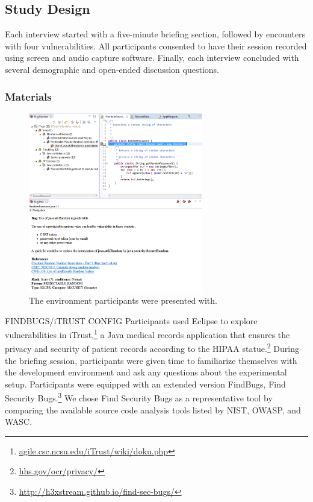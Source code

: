 \documentclass[conference]{IEEEtran}
\begin{document}
\subsection{Study Design}
\label{studyDesign}
Each interview started with a five-minute briefing section, followed by encounters with four vulnerabilities.
All participants consented to have their session recorded using screen and audio capture software.
Finally, each interview concluded with several demographic and open-ended discussion questions.


\subsubsection{Materials}

\begin{figure}
\centering
\includegraphics[width=3in]{Images/environment.png}
\caption{The environment participants were presented with.}
\label{fig:environment} 
\end{figure}
	
FINDBUGS/iTRUST CONFIG
Participants used Eclipse to explore vulnerabilities in iTrust,\footnote{\url{agile.csc.ncsu.edu/iTrust/wiki/doku.php}} a Java medical records application that ensures the privacy and security of patient records according to the HIPAA statue.\footnote{\url{hhs.gov/ocr/privacy/}} 
During the briefing session, participants were given time to familiarize themselves with the development environment and ask any questions about the experimental setup.
Participants were equipped with an extended version FindBugs, Find Security Bugs.\footnote{\url{http://h3xstream.github.io/find-sec-bugs/}} 
We chose Find Security Bugs as a representative tool by comparing the available source code analysis tools listed by NIST, OWASP, and WASC.
\end{document}
